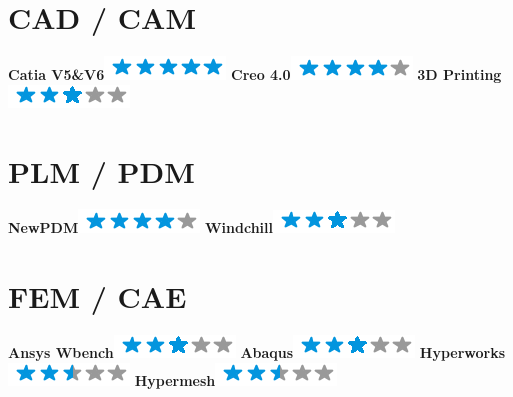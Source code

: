 \documentclass[]{friggeri-cv}
\begin{document}
\begin{aside}
\section{CAD / CAM}
\textbf{Catia V5\&V6}\includegraphics[scale=0.40]{res/img/5stars.png}
\textbf{Creo 4.0}\includegraphics[scale=0.40]{res/img/4stars.png}
\textbf{3D Printing}\includegraphics[scale=0.40]{res/img/3stars.png}\section{PLM / PDM}
\textbf{NewPDM}\includegraphics[scale=0.40]{res/img/4stars.png}
\textbf{Windchill}\includegraphics[scale=0.40]{res/img/3stars.png}\section{FEM / CAE}
\textbf{Ansys Wbench}\includegraphics[scale=0.40]{res/img/3stars.png}
\textbf{Abaqus}\includegraphics[scale=0.40]{res/img/3stars.png}
\textbf{Hyperworks}\includegraphics[scale=0.40]{res/img/2-5stars.png}
\textbf{Hypermesh}\includegraphics[scale=0.40]{res/img/2-5stars.png}
\end{aside}
\end{document}
